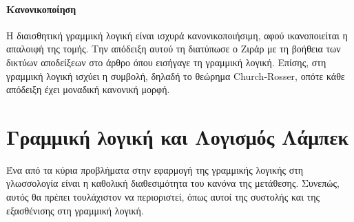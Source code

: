 \documentclass [a4paper,11pt] {book}
\theoremstyle{definition}
\theoremstyle{definition}
\begin{document}
\paragraph{Κανονικοποίηση} Η διαισθητική γραμμική λογική είναι ισχυρά κανονικοποιήσιμη, αφού ικανοποιείται η απαλοιφή της τομής. Την απόδειξη αυτού τη διατύπωσε ο Ζιράρ με τη βοήθεια των δικτύων αποδείξεων στο άρθρο όπου εισήγαγε τη γραμμική λογική. Επίσης, στη γραμμική λογική ισχύει η συμβολή, δηλαδή το θεώρημα Church-Rosser, οπότε κάθε απόδειξη έχει μοναδική κανονική μορφή.
\section{Γραμμική λογική και Λογισμός Λάμπεκ}
Ένα από τα κύρια προβλήματα στην εφαρμογή της γραμμικής λογικής στη γλωσσολογία είναι η καθολική διαθεσιμότητα του κανόνα της μετάθεσης. Συνεπώς, αυτός θα πρέπει τουλάχιστον να περιοριστεί, όπως αυτοί της συστολής και της εξασθένισης στη γραμμική λογική.
\end{document}
